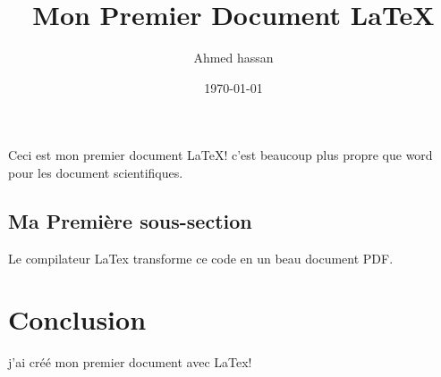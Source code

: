 \documentclass{article}
\title{Mon Premier Document LaTeX}
\author{Ahmed hassan}
\date{\today}
\begin{document}
	
	Ceci est mon premier document LaTeX!
	c'est beaucoup plus propre que word pour les document scientifiques.
	
	\subsection{Ma Première sous-section}
	Le compilateur LaTex transforme ce code en un beau document PDF.
	
	\section{Conclusion}
	j'ai créé mon premier document avec LaTex!
	
\end{document}
